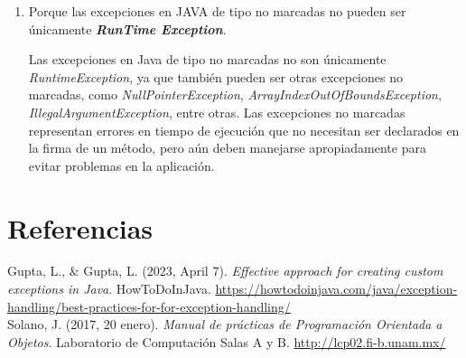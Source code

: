 \documentclass[11pt, twocolumn]{article}
\begin{document}
\begin{enumerate}
    \item Porque las excepciones en JAVA de tipo no marcadas no pueden ser únicamente
    \textit{\textbf{RunTime Exception}}.

    Las excepciones en Java de tipo no marcadas no son únicamente \textit{RuntimeException}, ya que también pueden ser otras excepciones no marcadas, como \textit{NullPointerException}, \textit{ArrayIndexOutOfBoundsException}, \textit{IllegalArgumentException}, entre otras. Las excepciones no marcadas representan errores en tiempo de ejecución que no necesitan ser declarados en la firma de un método, pero aún deben manejarse apropiadamente para evitar problemas en la aplicación.
  \end{enumerate}

  \section*{Referencias}
  \begin{small}
    Gupta, L., $\&$ Gupta, L. (2023, April 7). \textit{Effective approach for creating custom exceptions in Java}. HowToDoInJava. \url{https://howtodoinjava.com/java/exception-handling/best-practices-for-for-exception-handling/} \\

    Solano, J. (2017, 20 enero). \textit{Manual de prácticas de Programación Orientada a Objetos}. Laboratorio de Computación Salas A y B. \url{http://lcp02.fi-b.unam.mx/} \\
  \end{small}
\end{document}
